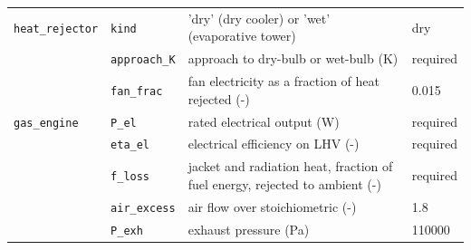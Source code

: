 \begin{longtable}{@{}p{3.1cm}p{2.9cm}p{6.6cm}p{2.0cm}@{}}
\texttt{heat\_rejector} & \texttt{kind} & 'dry' (dry cooler) or 'wet' (evaporative tower) & dry \\
 & \texttt{approach\_K} & approach to dry-bulb or wet-bulb (K) & required \\
 & \texttt{fan\_frac} & fan electricity as a fraction of heat rejected (-) & 0.015 \\
\texttt{gas\_engine} & \texttt{P\_el} & rated electrical output (W) & required \\
 & \texttt{eta\_el} & electrical efficiency on LHV (-) & required \\
 & \texttt{f\_loss} & jacket and radiation heat, fraction of fuel energy, rejected to ambient (-) & required \\
 & \texttt{air\_excess} & air flow over stoichiometric (-) & 1.8 \\
 & \texttt{P\_exh} & exhaust pressure (Pa) & 110000 \\
\bottomrule
\end{longtable}\endgroup
